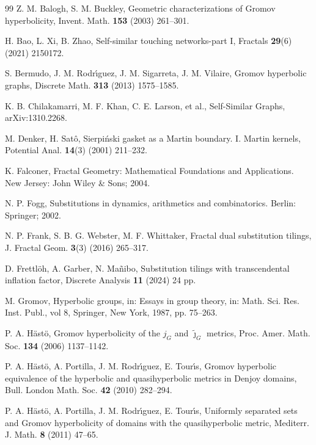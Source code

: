 \documentclass[reqno]{amsart}
\theoremstyle{plain}
\numberwithin{equation}{section}
\begin{document}
\bigskip

\begin{thebibliography}{99}
 Z. M. Balogh, S. M. Buckley, Geometric characterizations of
Gromov hyperbolicity, Invent. Math. \textbf{153} (2003) 261--301.

 H. Bao, L. Xi, B. Zhao, Self-similar touching networks-part I,
Fractals \textbf{29}(6) (2021) 2150172.

 S. Bermudo, J. M. Rodr\'{\i}guez, J. M. Sigarreta, J. M.
Vilaire, Gromov hyperbolic graphs, Discrete Math. \textbf{313} (2013)
1575--1585.

 K. B. Chilakamarri, M. F. Khan, C. E. Larson, et al.,
Self-Similar Graphs, arXiv:1310.2268.

 M. Denker, H. Sat\^{o}, Sierpi\'{n}ski gasket as a Martin
boundary. I. Martin kernels, Potential Anal. \textbf{14}(3) (2001) 211--232.

 K. Falconer, Fractal Geometry: Mathematical Foundations
and Applications. New Jersey: John Wiley \& Sons; 2004.

 N. P. Fogg, Substitutions in dynamics, arithmetics and
combinatorics. Berlin: Springer; 2002.

 N. P. Frank, S. B. G. Webster, M. F. Whittaker, Fractal dual
substitution tilings, J. Fractal Geom. \textbf{3}(3) (2016) 265--317.

 D. Frettl\"{o}h, A. Garber, N. Ma\~{n}ibo, Substitution
tilings with transcendental inflation factor, Discrete Analysis \textbf{11}
(2024) 24 pp.

 M. Gromov, Hyperbolic groups, in: Essays in group theory,
in: Math. Sci. Res. Inst. Publ., vol 8, Springer, New York, 1987, pp.
75--263.

 P. A. H\"{a}st\"{o}, Gromov hyperbolicity of the $j_{G}$
and $\widetilde{\jmath }_{G}$ metrics, Proc. Amer. Math. Soc. \textbf{134}
(2006) 1137--1142.

 P. A. H\"{a}st\"{o}, A. Portilla, J. M. Rodr\'{\i}guez,
E. Tour\'{\i}s, Gromov hyperbolic equivalence of the hyperbolic and
quasihyperbolic metrics in Denjoy domains, Bull. London Math. Soc. \textbf{42%
} (2010) 282--294.

 P. A. H\"{a}st\"{o}, A. Portilla, J. M. Rodr\'{\i}guez,
E. Tour\'{\i}s, Uniformly separated sets and Gromov hyperbolicity of domains
with the quasihyperbolic metric, Mediterr. J. Math. \textbf{8} (2011) 47--65.


\end{thebibliography}
\end{document}
